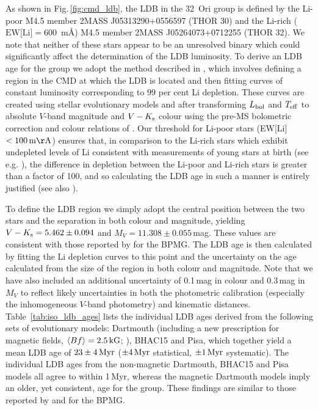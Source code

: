 \documentclass[usenatbib]{mnras}
\begin{document}
As shown in Fig.\,\ref{fig:cmd_ldb}, the LDB in the 32~Ori group is
defined by the Li-poor M4.5 member 2MASS J05313290+0556597 (THOR 30) and the
Li-rich ($\textrm{EW[Li]}=600$~m\AA) M4.5 member 2MASS
J05264073+0712255 (THOR 32). We note that neither of these stars appear to be an
unresolved binary which could significantly affect the determination
of the LDB luminosity. To derive an LDB age for the group we adopt the
method described in \cite{Binks14,Binks16}, which involves defining a
region in the CMD at which the LDB is located and then fitting curves
of constant luminosity corresponding to 99 per cent Li depletion.
These curves are created using stellar evolutionary models and after
transforming $L_{\rm{bol}}$ and $T_{\rm{eff}}$ to absolute $V$-band
magnitude and $V-K_{\rm{s}}$ colour using the pre-MS bolometric
correction and colour relations of \cite{Pecaut13}. Our threshold for
Li-poor stars (EW[Li]\,$< 100\,\rm{m\AA}$) ensures that, in comparison
to the Li-rich stars which exhibit undepleted levels of Li consistent
with measurements of young stars at birth (see
e.g. \citealp{Palla07}), the difference in depletion between the
Li-poor and Li-rich stars is greater than a factor of 100, and so
calculating the LDB age in such a manner is entirely justified (see
also \citealp{Jeffries05,Tognelli15}).

To define the LDB region we simply adopt the central position between
the two stars and the separation in both colour and magnitude,
yielding $V-K_{\rm{s}}=5.462\pm0.094$ and
$M_{V}=11.308\pm0.055$\,mag. These values are consistent with those
reported by \cite{Binks14} for the BPMG. The LDB age is then
calculated by fitting the Li depletion curves to this point and the
uncertainty on the age calculated from the size of the region in both
colour and magnitude. Note that we have also included an additional
uncertainty of 0.1\,mag in colour and 0.3\,mag in $M_{V}$ to reflect
likely uncertainties in both the photometric calibration (especially
the inhomogeneous $V$-band photometry) and kinematic
distances. Table~\ref{tab:iso_ldb_ages} lists the individual LDB ages
derived from the following sets of evolutionary models: Dartmouth
(including a new prescription for magnetic fields, $\langle
Bf\rangle=2.5\,\rm{kG}$; \citealp{Feiden13,Feiden14}), BHAC15 and
Pisa, which together yield a mean LDB age of $23\pm4\,\rm{Myr}$
($\pm4\,\rm{Myr}$ statistical, $\pm1\,\rm{Myr}$ systematic). The
individual LDB ages from the non-magnetic Dartmouth, BHAC15 and Pisa
models all agree to within 1\,Myr, whereas the magnetic Dartmouth
models imply an older, yet consistent, age for the group. These
findings are similar to those reported by \cite{Malo14b} and
\cite{Binks16} for the BPMG.
\end{document}
